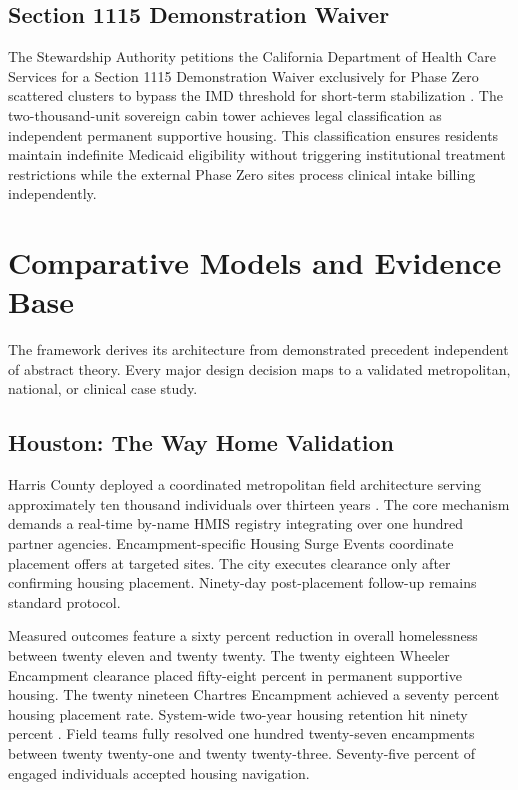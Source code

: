 \documentclass[12pt, letterpaper]{article}
\begin{document}
\subsection{Section 1115 Demonstration Waiver}

The Stewardship Authority petitions the California Department of Health Care Services for a Section 1115 Demonstration Waiver exclusively for Phase Zero scattered clusters to bypass the IMD threshold for short-term stabilization \citep{calaim_1115_waiver_2023}. The two-thousand-unit sovereign cabin tower achieves legal classification as independent permanent supportive housing. This classification ensures residents maintain indefinite Medicaid eligibility without triggering institutional treatment restrictions while the external Phase Zero sites process clinical intake billing independently.

\clearpage
\section{Comparative Models and Evidence Base}

The framework derives its architecture from demonstrated precedent independent of abstract theory. Every major design decision maps to a validated metropolitan, national, or clinical case study.

\subsection{Houston: The Way Home Validation}

Harris County deployed a coordinated metropolitan field architecture serving approximately ten thousand individuals over thirteen years \citep{houston_way_home_2024}. The core mechanism demands a real-time by-name HMIS registry integrating over one hundred partner agencies. Encampment-specific Housing Surge Events coordinate placement offers at targeted sites. The city executes clearance only after confirming housing placement. Ninety-day post-placement follow-up remains standard protocol.

Measured outcomes feature a sixty percent reduction in overall homelessness between twenty eleven and twenty twenty. The twenty eighteen Wheeler Encampment clearance placed fifty-eight percent in permanent supportive housing. The twenty nineteen Chartres Encampment achieved a seventy percent housing placement rate. System-wide two-year housing retention hit ninety percent \citep{houston_way_home_2024}. Field teams fully resolved one hundred twenty-seven encampments between twenty twenty-one and twenty twenty-three. Seventy-five percent of engaged individuals accepted housing navigation.
\end{document}
